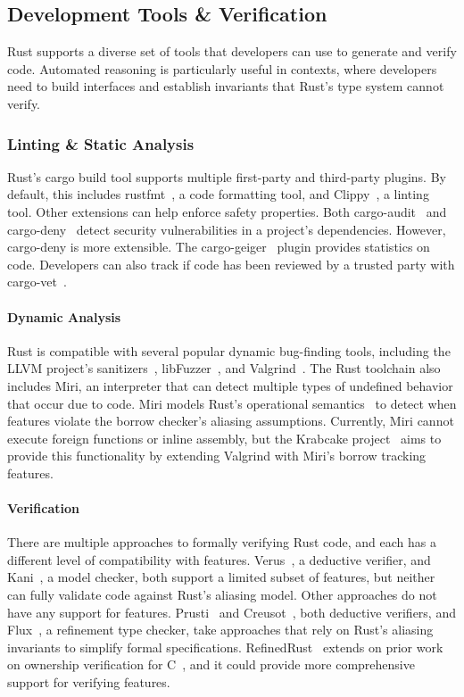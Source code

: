 \subsection{Development Tools \& Verification}
Rust supports a diverse set of tools that developers can use to generate and verify code. Automated reasoning is particularly useful in \unsafe contexts, where developers need to build interfaces and establish invariants that Rust's type system cannot verify. 

\subsubsection{Linting \& Static Analysis}
Rust's cargo build tool supports multiple first-party and third-party plugins. By default, this includes rustfmt~\cite{rustfmt}, a code formatting tool, and Clippy~\cite{clippy}, a linting tool. Other extensions can help enforce safety properties. Both cargo-audit~\cite{cargoaudit} and cargo-deny~\cite{cargodeny} detect security vulnerabilities in a project's dependencies. However, cargo-deny is more extensible. The cargo-geiger~\cite{cargogeiger} plugin provides statistics on \unsafe code. Developers can also track if code has been reviewed by a trusted party with cargo-vet~\cite{cargovet}. 

\paragraph{Dynamic Analysis} Rust is compatible with several popular dynamic bug-finding tools, including the LLVM project's sanitizers~\cite{clang}, libFuzzer~\cite{libfuzzer}, and Valgrind~\cite{seward07}. The Rust toolchain also includes Miri, an interpreter that can detect multiple types of undefined behavior that occur due to \unsafe code. Miri models Rust's operational semantics~\cite{stacked_borrows, tree_borrows} to detect when \unsafe features violate the borrow checker's aliasing assumptions. Currently, Miri cannot execute foreign functions or inline assembly, but the Krabcake project~\cite{krabcake} aims to provide this functionality by extending Valgrind with Miri's borrow tracking features. 

\paragraph{Verification} There are multiple approaches to formally verifying Rust code, and each has a different level of compatibility with \unsafe features. Verus~\cite{lattuada23}, a deductive verifier, and Kani~\cite{kani_vanhattum22}, a model checker, both support a limited subset of \unsafe features, but neither can fully validate \unsafe code against Rust's aliasing model. Other approaches do not have any support for \unsafe features. Prusti~\cite{prusti_astrauskas19} and Creusot~\cite{creusot_denis22}, both deductive verifiers, and Flux~\cite{lehmann23}, a refinement type checker, take approaches that rely on Rust's aliasing invariants to simplify formal specifications. RefinedRust~\cite{refinedrust} extends on prior work on ownership verification for C~\cite{sammler21}, and it could provide more comprehensive support for verifying \unsafe features. 

